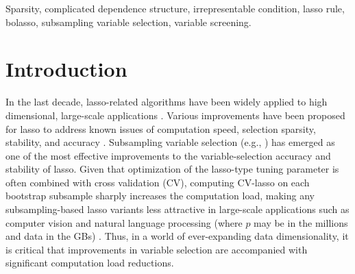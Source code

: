 \documentclass[11pt,review,authoryear]{elsarticle}
\begin{document}
\begin{keyword}
Sparsity, complicated dependence structure, irrepresentable condition, lasso rule, bolasso, subsampling variable selection, variable screening.
\end{keyword}

\maketitle




\section{Introduction}

In the last decade, lasso-related algorithms have been widely applied to high dimensional, large-scale applications \citep{efronall04, friedman2007pathwise, friedman2010regularization}. Various improvements have been proposed for lasso to address known issues of computation speed, selection sparsity, stability, and accuracy \citep{weisberg04, lim2016estimation}. Subsampling variable selection (e.g., \citet{bach2008bolasso, meinshausen2010stability}) has emerged as one of the most effective improvements to the variable-selection accuracy and stability of lasso. Given that optimization of the lasso-type tuning parameter is often combined with cross validation (CV), computing CV-lasso on each bootstrap subsample sharply increases the computation load, making any subsampling-based lasso variants less attractive in large-scale applications such as computer vision and natural language processing (where $p$ may be in the millions and data in the GBs) \citep{xu2012asymptotic}. Thus, in a world of ever-expanding data dimensionality, it is critical that improvements in variable selection are accompanied with significant computation load reductions.
\end{document}
